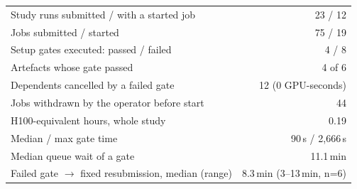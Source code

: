 \begin{tabular}{@{}l r@{}}
\toprule
Study runs submitted / with a started job & 23 / 12 \\
Jobs submitted / started & 75 / 19 \\
Setup gates executed: passed / failed & 4 / 8 \\
Artefacts whose gate passed & 4 of 6 \\
Dependents cancelled by a failed gate & 12 (0 GPU-seconds) \\
Jobs withdrawn by the operator before start & 44 \\
H100-equivalent hours, whole study & 0.19 \\
Median / max gate time & 90\,s / 2{,}666\,s \\
Median queue wait of a gate & 11.1\,min \\
Failed gate $\to$ fixed resubmission, median (range) & 8.3\,min (3--13\,min, n=6) \\
\bottomrule
\end{tabular}
